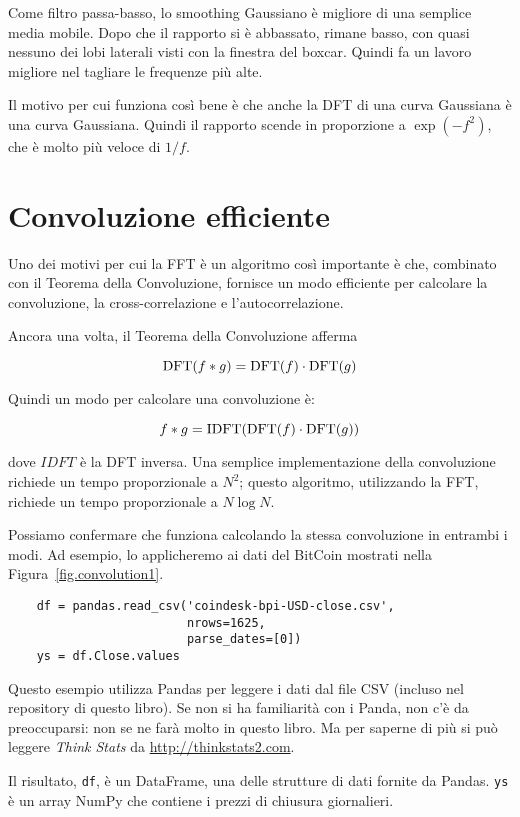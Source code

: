\documentclass[12pt,a4paper]{book}
\begin{document}
Come filtro passa-basso, lo smoothing Gaussiano è migliore di una semplice media mobile. Dopo che il rapporto si è abbassato, rimane basso, con quasi nessuno dei lobi laterali visti con la finestra del boxcar. Quindi fa un lavoro migliore nel tagliare le frequenze più alte.

Il motivo per cui funziona così bene è che anche la DFT di una curva Gaussiana è una curva Gaussiana. Quindi il rapporto scende in proporzione a $\exp(-f^2)$, che è molto più veloce di $1/f$.

\section{Convoluzione efficiente} \label{effconv} 

Uno dei motivi per cui la FFT è un algoritmo così importante è che, combinato con il Teorema della Convoluzione, fornisce un modo efficiente per calcolare la convoluzione, la cross-correlazione e l'autocorrelazione.

Ancora una volta, il Teorema della Convoluzione afferma

%
\[ \mathrm{DFT}(f \ast g) = \mathrm{DFT}(f) \cdot \mathrm{DFT}(g) \] 

%
Quindi un modo per calcolare una convoluzione è:

%
\[ f \ast g = \mathrm{IDFT}(\mathrm{DFT}(f) \cdot \mathrm{DFT}(g)) \] 

%
dove $IDFT$ è la DFT inversa. Una semplice implementazione della convoluzione richiede un tempo proporzionale a $N^2$; questo algoritmo, utilizzando la FFT, richiede un tempo proporzionale a $N \log N$.

Possiamo confermare che funziona calcolando la stessa convoluzione in entrambi i modi. Ad esempio, lo applicheremo ai dati del BitCoin mostrati nella Figura~\ref{fig.convolution1}.

\begin{verbatim} 
    df = pandas.read_csv('coindesk-bpi-USD-close.csv',
                         nrows=1625,
                         parse_dates=[0])
    ys = df.Close.values
 \end{verbatim} 

Questo esempio utilizza Pandas per leggere i dati dal file CSV (incluso nel repository di questo libro). Se non si ha familiarità con i Panda, non c'è da preoccuparsi: non se ne farà molto in questo libro. Ma per saperne di più si può leggere {\it Think Stats} da \url{http://thinkstats2.com}.

Il risultato, {\tt df}, è un DataFrame, una delle strutture di dati fornite da Pandas. {\tt ys} è un array NumPy che contiene i prezzi di chiusura giornalieri.
\end{document}
